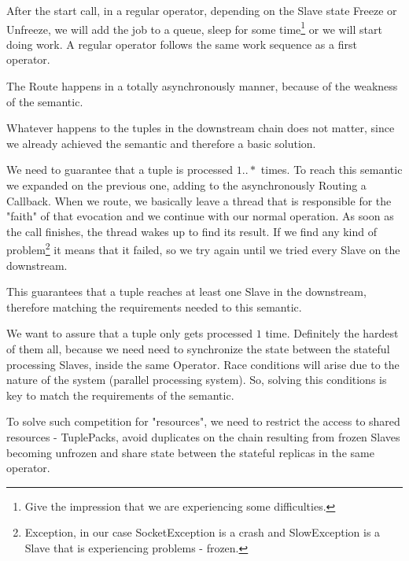 \documentclass[times, 10pt,twocolumn]{article}
\begin{document}
After the start call, in a regular operator, depending on the Slave state Freeze or Unfreeze, we will add the job to a queue, sleep for some time\footnote
{%
	Give the impression that we are experiencing some difficulties.
}  
or we will start doing work. A regular operator follows the same work sequence as a first operator.

The Route happens in a totally asynchronously manner, because of the weakness of the semantic. 

Whatever happens to the tuples in the downstream chain does not matter, since we already achieved the semantic and therefore a basic solution.


We need to guarantee that a tuple is processed $1..*$ times. To reach this semantic we expanded on the previous one, adding to the asynchronously Routing a Callback. When we route, we basically leave a thread that is responsible for the "faith" of that evocation and we continue with our normal operation. As soon as the call finishes, the thread wakes up to find its result. If we find any kind of problem\footnote
{%
	Exception, in our case SocketException is a crash and SlowException is a Slave that is experiencing problems - frozen.
}   
it means that it failed, so we try again until we tried every Slave on the downstream. 

This guarantees that a tuple reaches at least one Slave in the downstream, therefore matching the requirements needed to this semantic.



We want to assure that a tuple only gets processed $1$ time. Definitely the hardest of them all, because we need need to synchronize the state between the stateful processing Slaves, inside the same Operator. Race conditions will arise due to the nature of the system (parallel processing system). So, solving this conditions is key to match the requirements of the semantic. 

To solve such competition for "resources", we need to restrict the access to shared resources - TuplePacks, avoid duplicates on the chain resulting from frozen Slaves becoming unfrozen and share state between the stateful replicas in the same operator.
\end{document}
